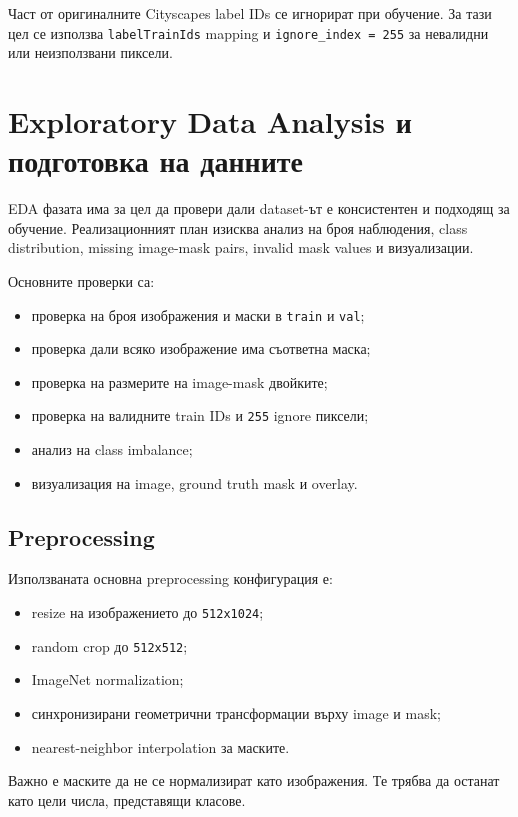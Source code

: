 \documentclass[12pt,a4paper]{article}
\newcommand{\code}[1]{\texttt{#1}}
\begin{document}
Част от оригиналните Cityscapes label IDs се игнорират при обучение. За тази цел се използва \code{labelTrainIds} mapping и \code{ignore\_index = 255} за невалидни или неизползвани пиксели.

\section{Exploratory Data Analysis и подготовка на данните}

EDA фазата има за цел да провери дали dataset-ът е консистентен и подходящ за обучение. Реализационният план изисква анализ на броя наблюдения, class distribution, missing image-mask pairs, invalid mask values и визуализации.

Основните проверки са:

\begin{itemize}
  \item проверка на броя изображения и маски в \code{train} и \code{val};
  \item проверка дали всяко изображение има съответна маска;
  \item проверка на размерите на image-mask двойките;
  \item проверка на валидните train IDs и \code{255} ignore пиксели;
  \item анализ на class imbalance;
  \item визуализация на image, ground truth mask и overlay.
\end{itemize}

\subsection{Preprocessing}

Използваната основна preprocessing конфигурация е:

\begin{itemize}
  \item resize на изображението до \code{512x1024};
  \item random crop до \code{512x512};
  \item ImageNet normalization;
  \item синхронизирани геометрични трансформации върху image и mask;
  \item nearest-neighbor interpolation за маските.
\end{itemize}

Важно е маските да не се нормализират като изображения. Те трябва да останат като цели числа, представящи класове.
\end{document}
